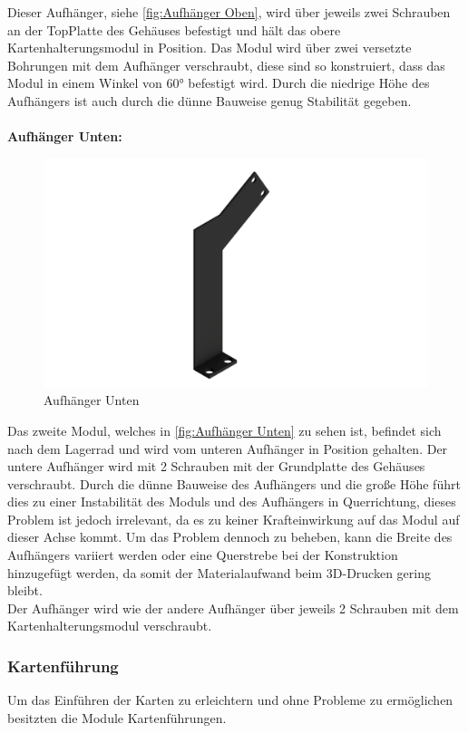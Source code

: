 Dieser Aufhänger, siehe \autoref{fig:Aufhänger Oben}, wird über jeweils zwei Schrauben an der TopPlatte des Gehäuses befestigt und hält das obere Kartenhalterungsmodul in Position.
Das Modul wird über zwei versetzte Bohrungen mit dem Aufhänger verschraubt, diese sind so konstruiert, dass das Modul in einem
Winkel von 60° befestigt wird.
Durch die niedrige Höhe des Aufhängers ist auch durch die dünne Bauweise genug Stabilität gegeben.\\\\


\textbf{Aufhänger Unten:}

\begin{figure}
    \includegraphics[width=8 cm]{fig/mech/AufhaengerIUnten}
    \caption{Aufhänger Unten}
    \label{fig:Aufhänger Unten}
\end{figure}

Das zweite Modul, welches in \autoref{fig:Aufhänger Unten} zu sehen ist, befindet sich nach dem Lagerrad und wird vom unteren Aufhänger in Position gehalten. Der untere Aufhänger
wird mit 2 Schrauben mit der Grundplatte des Gehäuses verschraubt. Durch die dünne Bauweise des Aufhängers und die
große Höhe führt dies zu einer Instabilität des Moduls und des Aufhängers in Querrichtung, dieses Problem ist jedoch irrelevant, da es
zu keiner Krafteinwirkung auf das Modul auf dieser Achse kommt. Um das Problem dennoch zu beheben, kann die Breite des
Aufhängers variiert werden oder eine Querstrebe bei der Konstruktion hinzugefügt werden, da somit der Materialaufwand beim 3D-Drucken gering bleibt.\\
Der Aufhänger wird wie der andere Aufhänger über jeweils 2 Schrauben mit dem Kartenhalterungsmodul verschraubt.


\subsubsection{Kartenführung}
Um das Einführen der Karten zu erleichtern und ohne Probleme zu ermöglichen besitzten die Module Kartenführungen.

